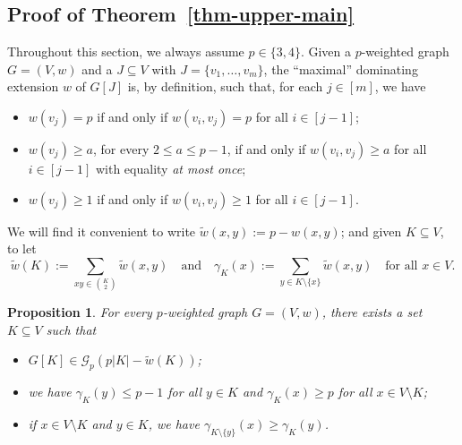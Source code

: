 \documentclass[10pt,a4paper]{article}
\newtheorem{proposition}[theorem]{Proposition}
\theoremstyle{definition}
\newcommand{\cG}{\mathcal{G}}
\begin{document}
\subsection{Proof of Theorem~\ref{thm-upper-main}}\label{sec-upper-main}
Throughout this section, we always assume $p\in\{3,4\}$. 
Given a $p$-weighted graph $G=(V,w)$ and a $J \subseteq V$ with $J = \{v_1,\ldots,v_m\}$,
the ``maximal'' dominating extension $w$ of $G[J]$ is, by definition, such that,
for each $j\in [m]$, we have
\begin{itemize}
	\item $w(v_j) = p$ if and only if $w(v_i,v_j) = p$ for all $i \in [j-1]$;
	\item $w(v_j) \geq a$, for every $2\le a\le p-1$, if and only if $w(v_i,v_j)\geq a$ for all $i \in [j-1]$ with equality \emph{at most once};
	\item $w(v_j)\geq 1$ if and only if $w(v_i,v_j) \geq 1$ for all $i \in [j-1]$.
\end{itemize}

We will find it convenient to write $\tilde{w}(x,y) := p - w(x,y)$; and given $K \subseteq V$, to let
$$
\tilde{w}(K) := \sum_{xy \in \binom{K}{2}}\tilde{w}(x,y)\quad\text{and}\quad \gamma_K(x) := \sum_{y \in K\setminus\{x\}}\tilde{w}(x,y)\quad\text{for all }x \in V.
$$

\begin{proposition}\label{prop-hero}
	For every $p$-weighted graph $G=(V,w)$, there exists a set $K \subseteq V$ such that
	\begin{itemize}
	\item[(i)] $G[K] \in \cG_p(p|K|-\tilde{w}(K))$;
	\item[(ii)] we have $\gamma_K(y) \leq p-1$ for all $y \in K$ and $\gamma_K(x) \geq p$ for all $x \in V\setminus K$;
	\item[(iii)] if $x \in V\setminus K$ and $y \in K$, we have $\gamma_{K\setminus\{y\}}(x) \geq \gamma_K(y)$.
	\end{itemize}
\end{proposition}
\end{document}
